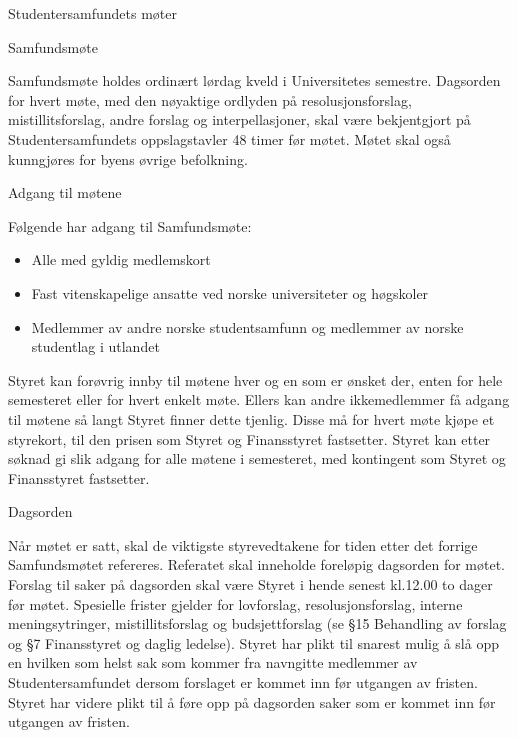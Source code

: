 \documentclass[fsbok.tex]{subfiles}
\begin{document}
\begin{lovkapittel}{Studentersamfundets møter}

  \begin{lovparagraf}{Samfundsmøte}
  
Samfundsmøte holdes ordinært lørdag kveld i Universitetes semestre. Dagsorden for hvert møte, med den nøyaktige
ordlyden på resolusjonsforslag, mistillitsforslag, andre forslag og interpellasjoner, skal være bekjentgjort på
Studentersamfundets oppslagstavler 48 timer før møtet. Møtet skal også kunngjøres for byens øvrige befolkning.
   
   \end{lovparagraf}
   
   \begin{lovparagraf}{Adgang til møtene}
   
Følgende har adgang til Samfundsmøte:

\begin{itemize}
  \item Alle med gyldig medlemskort
  \item Fast vitenskapelige ansatte ved norske universiteter og høgskoler
  \item Medlemmer av andre norske studentsamfunn og medlemmer av norske studentlag i utlandet
\end{itemize}

Styret kan forøvrig innby til møtene hver og en som er ønsket der, enten for hele semesteret eller for hvert enkelt
møte. Ellers kan andre ikkemedlemmer få adgang til møtene så langt Styret finner dette tjenlig. Disse må for hvert
møte kjøpe et styrekort, til den prisen som Styret og Finansstyret fastsetter. Styret kan etter søknad gi slik adgang for
alle møtene i semesteret, med kontingent som Styret og Finansstyret fastsetter.

  \end{lovparagraf}
  
  \begin{lovparagraf}{Dagsorden}

Når møtet er satt, skal de viktigste styrevedtakene for tiden etter det forrige Samfundsmøtet refereres. Referatet skal
inneholde foreløpig dagsorden for møtet. Forslag til saker på dagsorden skal være Styret i hende senest kl.12.00 to
dager før møtet. Spesielle frister gjelder for lovforslag, resolusjonsforslag, interne meningsytringer, mistillitsforslag
og budsjettforslag (se §15 Behandling av forslag og §7 Finansstyret og daglig ledelse). Styret har plikt til snarest
mulig å slå opp en hvilken som helst sak som kommer fra navngitte medlemmer av Studentersamfundet dersom
forslaget er kommet inn før utgangen av fristen. Styret har videre plikt til å føre opp på dagsorden saker som er
kommet inn før utgangen av fristen.


\end{lovparagraf}
\end{lovkapittel}
\end{document}
